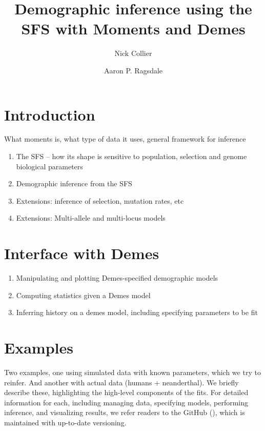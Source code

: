 \documentclass[]{article}
\begin{document}
\title{Demographic inference using the SFS with Moments and Demes}
\author[1]{Nick Collier}
\author[1,*]{Aaron P. Ragsdale}
\maketitle


\section{Introduction}

What moments is, what type of data it uses, general framework for inference
\begin{enumerate}
    \item The SFS -- how its shape is sensitive to population,
        selection and genome biological parameters
    \item Demographic inference from the SFS
    \item Extensions: inference of selection, mutation rates, etc
    \item Extensions: Multi-allele and multi-locus models
\end{enumerate}

\section{Interface with Demes}

\begin{enumerate}
    \item Manipulating and plotting Demes-specified demographic models
    \item Computing statistics given a Demes model
    \item Inferring history on a demes model, including specifying parameters to be fit
\end{enumerate}

\section{Examples}

Two examples, one using simulated data with known parameters, which we try to
reinfer. And another with actual data (humans + neanderthal). We briefly
describe these, highlighting the high-level components of the fits. For
detailed information for each, including managing data, specifying models,
performing inference, and visualizing results, we refer readers to the GitHub
(\url{}), which is maintained with up-to-date versioning.
\end{document}
